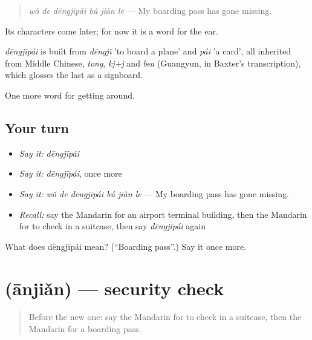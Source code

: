 \begin{quote}
\emph{wǒ de dēngjīpái bú jiàn le} — My boarding pass has gone missing.
\end{quote}

Its characters come later; for now it is a word for the ear.

\begin{cousinweb}
\emph{dēngjīpái} is built from \emph{dēngjī} 'to board a plane' and \emph{pái} 'a card', all inherited from Middle Chinese, \emph{tong}, \emph{kj+j} and \emph{bea} (Guangyun, in Baxter's transcription), which glosses the last as a signboard.
\end{cousinweb}

\begin{grammarlens}[title={What you've built}]
One more word for getting around.
\end{grammarlens}

\subsection*{Your turn}
\begin{itemize}
\raggedright
  \item \emph{Say it:} \emph{dēngjīpái}
  \item \emph{Say it:} \emph{dēngjīpái}, once more
  \item \emph{Say it:} \emph{wǒ de dēngjīpái bú jiàn le} — My boarding pass has gone missing.
  \item \emph{Recall:} say the Mandarin for an airport terminal building, then the Mandarin for to check in a suitcase, then say \emph{dēngjīpái} again
\end{itemize}

\begin{tcolorbox}[breakable,colback=teal!4,colframe=teal!35!black,title={Before you move on}]
What does dēngjīpái mean? (\textquotedblleft{}Boarding pass\textquotedblright{}.) Say it once more.
\end{tcolorbox}
\section[\texorpdfstring{\zh{安检} (ānjiǎn)}{安检 (ānjiǎn)}]{ (ānjiǎn) — security check}

\label{lesson:ZH-C415-anjian}



\begin{quote}
Before the new one: say the Mandarin for to check in a suitcase, then the Mandarin for a boarding pass.
\end{quote}

